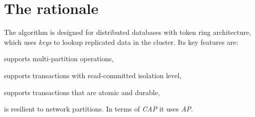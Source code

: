 
\section{The rationale}
The \mpt algorithm is designed for distributed databases with token ring architecture,
which uses \emph{keys} to lookup replicated data in the cluster. Its key features are: \begin{enumerate*}
\item supports multi-partition operations,
\item supports transactions with read-committed isolation level,
\item supports transactions that are atomic and durable,
\item is resilient to network partitions. In terms of \emph{CAP} \cite{Brewer:2012ba} it uses \emph{AP}.
\end{enumerate*}
